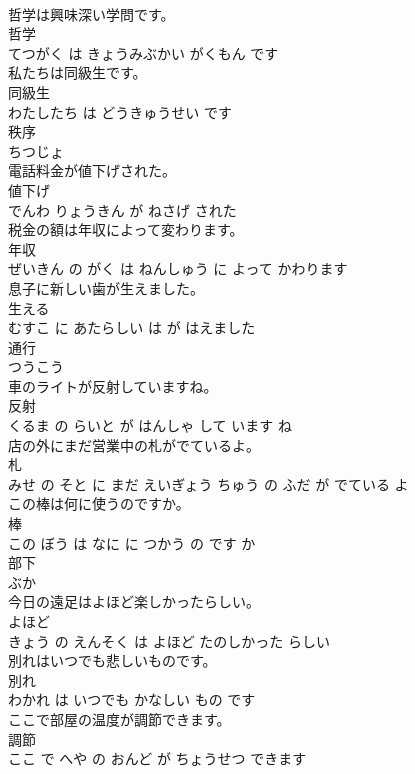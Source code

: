 \documentclass[8pt]{extreport}
\begin{document}
\begin{CJK}{UTF8}{min}
\\	哲学は興味深い学問です。	
\\	哲学 
\\	てつがく は きょうみぶかい がくもん です			
\\	私たちは同級生です。	
\\	同級生 
\\	わたしたち は どうきゅうせい です			
\\	秩序	
\\	ちつじょ			
\\	電話料金が値下げされた。	
\\	値下げ 
\\	でんわ りょうきん が ねさげ された			
\\	税金の額は年収によって変わります。	
\\	年収 
\\	ぜいきん の がく は ねんしゅう に よって かわります			
\\	息子に新しい歯が生えました。	
\\	生える 
\\	むすこ に あたらしい は が はえました			
\\	通行	
\\	つうこう			
\\	車のライトが反射していますね。	
\\	反射 
\\	くるま の らいと が はんしゃ して います ね			
\\	店の外にまだ営業中の札がでているよ。	
\\	札 
\\	みせ の そと に まだ えいぎょう ちゅう の ふだ が でている よ			
\\	この棒は何に使うのですか。	
\\	棒 
\\	この ぼう は なに に つかう の です か			
\\	部下	
\\	ぶか			
\\	今日の遠足はよほど楽しかったらしい。	
\\	よほど 
\\	きょう の えんそく は よほど たのしかった らしい			
\\	別れはいつでも悲しいものです。	
\\	別れ 
\\	わかれ は いつでも かなしい もの です			
\\	ここで部屋の温度が調節できます。	
\\	調節 
\\	ここ で へや の おんど が ちょうせつ できます			

\end{CJK}
\end{document}
